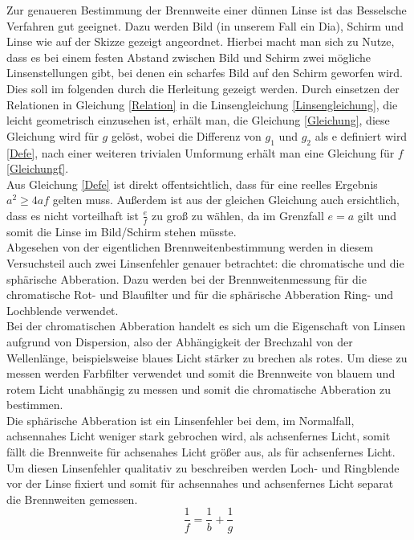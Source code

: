 Zur genaueren Bestimmung der Brennweite einer dünnen Linse ist das Besselsche Verfahren gut geeignet. Dazu werden Bild (in unserem Fall ein Dia), Schirm und Linse wie auf der Skizze gezeigt angeordnet. Hierbei macht man sich zu Nutze, dass es bei einem festen Abstand zwischen Bild und Schirm zwei mögliche Linsenstellungen gibt, bei denen ein scharfes Bild auf den Schirm geworfen wird. Dies soll im folgenden durch die Herleitung gezeigt werden. Durch einsetzen der Relationen in Gleichung \ref{Relation} in die Linsengleichung \ref{Linsengleichung}, die leicht geometrisch einzusehen ist, erhält man, die Gleichung \ref{Gleichung}, diese Gleichung wird für $g$ gelöst, wobei die Differenz von $g_1$ und $g_2$ als e definiert wird \ref{Defe}, nach einer weiteren trivialen Umformung erhält man eine Gleichung für $f$ \ref{Gleichungf}.\\
Aus Gleichung \ref{Defe} ist direkt offentsichtlich, dass für eine reelles Ergebnis $a^2 \geq 4af$ gelten muss. Außerdem ist aus der gleichen Gleichung auch ersichtlich, dass es nicht vorteilhaft ist $\frac{e}{f}$ zu groß zu wählen, da im Grenzfall $e = a$ gilt und somit die Linse im Bild/Schirm stehen müsste. \\
Abgesehen von der eigentlichen Brennweitenbestimmung werden in diesem Versuchsteil auch zwei Linsenfehler genauer betrachtet: die chromatische und die sphärische Abberation. Dazu werden bei der Brennweitenmessung für die chromatische Rot- und Blaufilter und für die sphärische Abberation Ring- und Lochblende verwendet.\\
Bei der chromatischen Abberation handelt es sich um die Eigenschaft von Linsen aufgrund von Dispersion, also der Abhängigkeit der Brechzahl von der Wellenlänge, beispielsweise blaues Licht stärker zu brechen als rotes. Um diese zu messen werden Farbfilter verwendet und somit die Brennweite von blauem und rotem Licht unabhängig zu messen und somit die chromatische Abberation zu bestimmen.\\
Die sphärische Abberation ist ein Linsenfehler bei dem, im Normalfall, achsennahes Licht weniger stark gebrochen wird, als achsenfernes Licht, somit fällt die Brennweite für achsenahes Licht größer aus, als für achsenfernes Licht. Um diesen Linsenfehler qualitativ zu beschreiben werden Loch- und Ringblende vor der Linse fixiert und somit für achsennahes und achsenfernes Licht separat die Brennweiten gemessen.\\

\begin{equation} \label{Linsengleichung}
    \frac{1}{f} = \frac{1}{b} + \frac{1}{g}
\end{equation}

